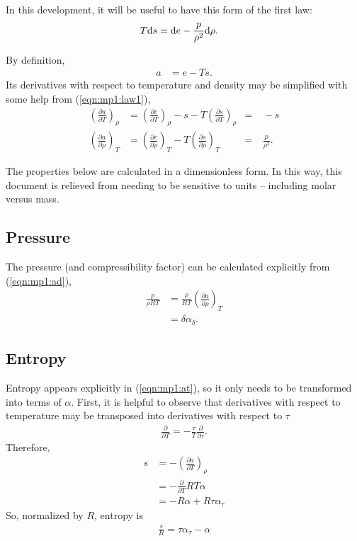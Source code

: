 In this development, it will be useful to have this form of the first law:
\begin{align}
T\mathrm{d} s &= \mathrm{d} e - \frac{p}{\rho^2} \mathrm{d} \rho\label{eqn:mp1:law1}.
\end{align}

By definition,
\begin{align}
a &= e - Ts \label{eqn:mp1:a}.
\end{align}
Its derivatives with respect to temperature and density may be simplified with some help from (\ref{eqn:mp1:law1}),
\begin{align}
\left(\frac{\partial a}{\partial T}\right)_\rho &= \left(\frac{\partial e}{\partial T}\right)_\rho - s - T \left(\frac{\partial s}{\partial T}\right)_\rho &=& \ -s\label{eqn:mp1:at}\\
\left(\frac{\partial a}{\partial \rho}\right)_T &= \left(\frac{\partial e}{\partial \rho}\right)_T - T \left(\frac{\partial s}{\partial \rho}\right)_T &=& \ \frac{p}{\rho^2} \label{eqn:mp1:ad}.
\end{align}

The properties below are calculated in a dimensionless form.  In this way, this document is relieved from needing to be sensitive to units -- including molar versus mass. 
 
\subsection{Pressure}\label{sec:mp1:p}

The pressure (and compressibility factor) can be calculated explicitly from (\ref{eqn:mp1:ad}),
\begin{align}
\frac{p}{\rho R T} &=  \frac{\rho}{R T}\left(\frac{\partial a}{\partial \rho}\right)_T\nonumber\\
&= \delta \alpha_\delta\label{eqn:mp1:p}.
\end{align}

\subsection{Entropy}\label{sec:mp1:s}

Entropy appears explicitly in (\ref{eqn:mp1:at}), so it only needs to be transformed into terms of $\alpha$.  First, it is helpful to observe that derivatives with respect to temperature may be transposed into derivatives with respect to $\tau$ 
\begin{align}
\frac{\partial}{\partial T} = -\frac{\tau}{T} \frac{\partial}{\partial \tau}.\nonumber
\end{align}
Therefore, 
\begin{align}
s &= -\left(\frac{\partial a}{\partial T}\right)_\rho \nonumber\\
&= -\frac{\partial}{\partial T} R T \alpha\nonumber\\
&= -R \alpha + R \tau \alpha_\tau
\end{align}
So, normalized by $R$, entropy is
\begin{align}
\frac{s}{R} = \tau \alpha_\tau - \alpha\label{eqn:mp1:s}
\end{align}

